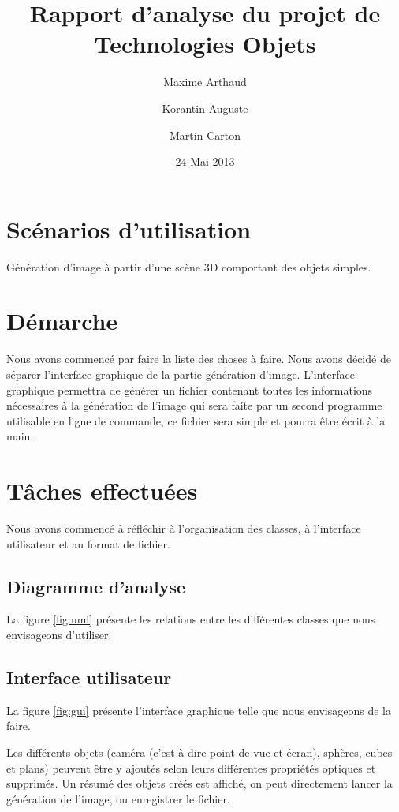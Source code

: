 \documentclass[a4paper]{article}
\title{Rapport d'analyse du projet de Technologies Objets}
\author{Maxime Arthaud \and Korantin Auguste \and Martin Carton}
\date{24 Mai 2013}
\begin{document}
\maketitle

\section{Scénarios d'utilisation}
  Génération d'image à partir d'une scène 3D comportant des objets simples.

\section{Démarche}
  Nous avons commencé par faire la liste des choses à faire. Nous avons décidé
  de séparer l'interface graphique de la partie génération d'image. L'interface
  graphique permettra de générer un fichier contenant toutes les informations
  nécessaires à la génération de l'image qui sera faite par un second programme
  utilisable en ligne de commande, ce fichier sera simple et pourra être écrit
  à la main.

\section{Tâches effectuées}
  Nous avons commencé à réfléchir à l'organisation des classes, à l'interface
  utilisateur et au format de fichier.

  \subsection{Diagramme d'analyse}
    La figure \ref{fig:uml} présente les relations entre les différentes classes
    que nous envisageons d'utiliser.

  \subsection{Interface utilisateur}
    La figure \ref{fig:gui} présente l'interface graphique telle que nous
    envisageons de la faire.

    Les différents objets (caméra (c'est à dire point de vue et écran),
    sphères, cubes et plans) peuvent être y ajoutés selon leurs différentes
    propriétés optiques et supprimés. Un résumé des objets créés est affiché, on
    peut directement lancer la génération de l'image, ou enregistrer le fichier.

\end{document}
